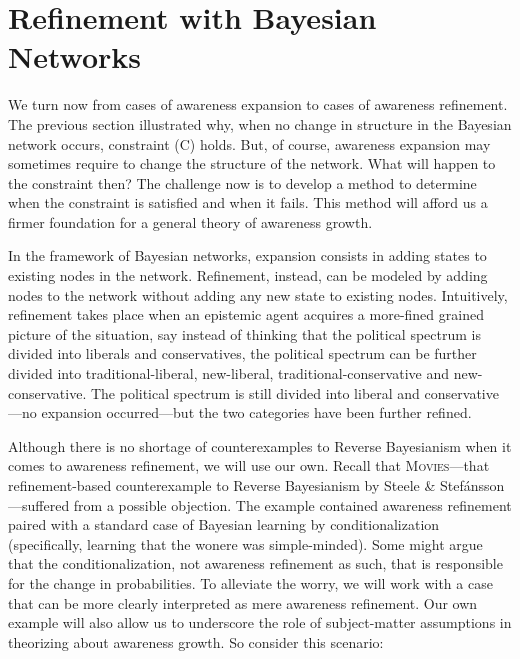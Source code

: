 \documentclass[
  11pt,
  dvipsnames,enabledeprecatedfontcommands]{scrartcl}
\begin{document}
\hypertarget{refinement-with-bayesian-networks}{%
\section{Refinement with Bayesian
Networks}\label{refinement-with-bayesian-networks}}

\label{sec:structural-both}

We turn now from cases of awareness expansion to cases of awareness
refinement. The previous section illustrated why, when no change in
structure in the Bayesian network occurs, constraint (C) holds. But, of
course, awareness expansion may sometimes require to change the
structure of the network. What will happen to the constraint then? The
challenge now is to develop a method to determine when the constraint is
satisfied and when it fails. This method will afford us a firmer
foundation for a general theory of awareness growth.

In the framework of Bayesian networks, expansion consists in adding
states to existing nodes in the network. Refinement, instead, can be
modeled by adding nodes to the network without adding any new state to
existing nodes. Intuitively, refinement takes place when an epistemic
agent acquires a more-fined grained picture of the situation, say
instead of thinking that the political spectrum is divided into liberals
and conservatives, the political spectrum can be further divided into
traditional-liberal, new-liberal, traditional-conservative and
new-conservative. The political spectrum is still divided into liberal
and conservative---no expansion occurred---but the two categories have
been further refined.

Although there is no shortage of counterexamples to Reverse Bayesianism
when it comes to awareness refinement, we will use our own. Recall that
\textsc{Movies}---that refinement-based counterexample to Reverse
Bayesianism by Steele \& Stefánsson---suffered from a possible
objection. The example contained awareness refinement paired with a
standard case of Bayesian learning by conditionalization (specifically,
learning that the wonere was simple-minded). Some might argue that the
conditionalization, not awareness refinement as such, that is
responsible for the change in probabilities. To alleviate the worry, we
will work with a case that can be more clearly interpreted as mere
awareness refinement. Our own example will also allow us to underscore
the role of subject-matter assumptions in theorizing about awareness
growth. So consider this scenario:
\end{document}
